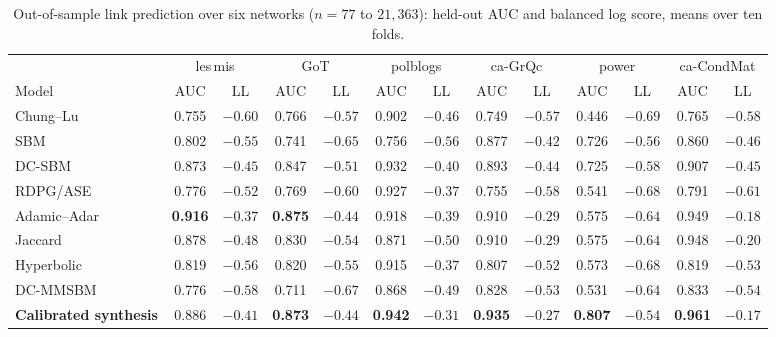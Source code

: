 \documentclass[12pt]{article}
\newcommand{\1}{\mathbf{1}}
\begin{document}
\begin{table}[t]
\centering
\scriptsize
\caption{Out-of-sample link prediction over six networks ($n=77$ to $21{,}363$): held-out AUC and balanced log score, means over ten folds.}
\label{tab:linkpred}
\setlength{\tabcolsep}{2.6pt}
\begin{tabular}{lcccccccccccc}
\toprule
& \multicolumn{2}{c}{\textsf{les\,mis}} & \multicolumn{2}{c}{\textsf{GoT}}
& \multicolumn{2}{c}{\textsf{polblogs}} & \multicolumn{2}{c}{\textsf{ca-GrQc}}
& \multicolumn{2}{c}{\textsf{power}} & \multicolumn{2}{c}{\textsf{ca-CondMat}}\\
\cmidrule(lr){2-3}\cmidrule(lr){4-5}\cmidrule(lr){6-7}\cmidrule(lr){8-9}\cmidrule(lr){10-11}\cmidrule(lr){12-13}
Model & AUC & LL & AUC & LL & AUC & LL & AUC & LL & AUC & LL & AUC & LL\\
\midrule
Chung--Lu & 0.755 & $-0.60$ & 0.766 & $-0.57$ & 0.902 & $-0.46$ & 0.749 & $-0.57$ & 0.446 & $-0.69$ & 0.765 & $-0.58$\\
SBM & 0.802 & $-0.55$ & 0.741 & $-0.65$ & 0.756 & $-0.56$ & 0.877 & $-0.42$ & 0.726 & $-0.56$ & 0.860 & $-0.46$\\
DC-SBM & 0.873 & $-0.45$ & 0.847 & $-0.51$ & 0.932 & $-0.40$ & 0.893 & $-0.44$ & 0.725 & $-0.58$ & 0.907 & $-0.45$\\
RDPG/ASE & 0.776 & $-0.52$ & 0.769 & $-0.60$ & 0.927 & $-0.37$ & 0.755 & $-0.58$ & 0.541 & $-0.68$ & 0.791 & $-0.61$\\
Adamic--Adar & \textbf{0.916} & $\mathbf{-0.37}$ & \textbf{0.875} & $\mathbf{-0.44}$ & 0.918 & $-0.39$ & 0.910 & $-0.29$ & 0.575 & $-0.64$ & 0.949 & $-0.18$\\
Jaccard & 0.878 & $-0.48$ & 0.830 & $-0.54$ & 0.871 & $-0.50$ & 0.910 & $-0.29$ & 0.575 & $-0.64$ & 0.948 & $-0.20$\\
Hyperbolic & 0.819 & $-0.56$ & 0.820 & $-0.55$ & 0.915 & $-0.37$ & 0.807 & $-0.52$ & 0.573 & $-0.68$ & 0.819 & $-0.53$\\
DC-MMSBM & 0.776 & $-0.58$ & 0.711 & $-0.67$ & 0.868 & $-0.49$ & 0.828 & $-0.53$ & 0.531 & $-0.64$ & 0.833 & $-0.54$\\
\textbf{Calibrated synthesis} & 0.886 & $-0.41$ & \textbf{0.873} & $-0.44$ & \textbf{0.942} & $\mathbf{-0.31}$ & \textbf{0.935} & $\mathbf{-0.27}$ & \textbf{0.807} & $\mathbf{-0.54}$ & \textbf{0.961} & $\mathbf{-0.17}$\\
\bottomrule
\end{tabular}
\end{table}
\end{document}
